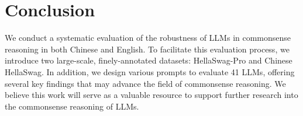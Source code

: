 \section{Conclusion}

We conduct a systematic evaluation of the robustness of LLMs in commonsense reasoning in both Chinese and English. 
To facilitate this evaluation process, we introduce two large-scale, finely-annotated datasets: HellaSwag-Pro and Chinese HellaSwag. 
In addition, we design various prompts to evaluate 41 LLMs, offering several key findings that may advance the field of commonsense reasoning. 
We believe this work will serve as a valuable resource to support further research into the commonsense reasoning of LLMs.